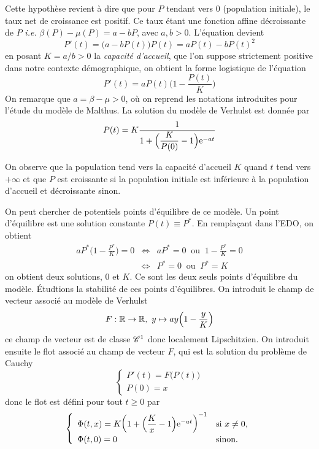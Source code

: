 Cette hypothèse revient à dire que pour $P$ tendant vers $0$ (population initiale), le taux net de croissance est positif. Ce taux étant une fonction affine décroissante de $P$ \textit{i.e.} $\beta(P)-\mu(P)=a-bP$, avec $a,b>0$. L'équation devient 
\begin{equation*}
    P'(t) = \big(a-bP(t)\big)P(t) = aP(t)-bP(t)^2
\end{equation*}
en posant $K=a/b >0$ la \textcolor{astral}{\textit{capacité d'accueil}}, que l'on suppose strictement positive dans notre contexte démographique, on obtient la forme \og logistique \fg{} de l'équation 
\begin{equation*}
    P'(t) = aP(t)\Big(1-\frac{P(t)}{K}\Big)
\end{equation*}
On remarque que $a=\beta-\mu>0$, où on reprend les notations introduites pour l'étude du modèle de Malthus. La solution du modèle de Verhulst est donnée par 
\begin{equation*}
    P(t) = K \frac{1}{1+\Big(\dfrac{K}{P(0)}-1\Big)\mathrm{e}^{-at}}
\end{equation*}

\begin{remark}
    On observe que la population tend vers la capacité d'accueil $K$ quand $t$ tend vers $+\infty$ et que $P$ est croissante si la population initiale est inférieure à la population d'accueil et décroissante sinon.
\end{remark}

On peut chercher de potentiels points d'équilibre de ce modèle. Un point d'équilibre est une solution constante $P(t) \equiv P^*$. En remplaçant dans l'EDO, on obtient
\begin{eqnarray*}
    aP^*\Big(1-\frac{P^*}{K}\Big) = 0 &\iff& aP^* = 0 \ \text{ ou } \ 1-\frac{P^*}{K} = 0 \\
    &\iff& P^* = 0 \ \text{ ou } \ P^* = K
\end{eqnarray*}
on obtient deux solutions, $0$ et $K$. Ce sont les deux seuls points d'équilibre du modèle. \'Etudtions la stabilité de ces points d'équilibres. On introduit le champ de vecteur associé au modèle de Verhulst
\begin{equation*}
    F : \mathbb{R} \rightarrow \mathbb{R}, \ y \mapsto ay\Big(1-\frac{y}{K}\Big)
\end{equation*}
ce champ de vecteur est de classe $\mathscr{C}^1$ donc localement Lipschitzien. On introduit ensuite le flot associé au champ de vecteur $F$, qui est la solution du problème de Cauchy 
\begin{equation*}
    \left\{\begin{array}{l}
        P'(t) = F\big(P(t)\big) \\
        P(0)=x
    \end{array}\right.
\end{equation*}
donc le flot est défini pour tout $t \geq 0$ par 
\begin{equation*}
    \left\{\begin{array}{ll}
        \Phi(t,x) = K \bigg(1+\Big(\dfrac{K}{x}-1\Big)\mathrm{e}^{-at}\bigg)^{-1} & \text{si } x \neq 0, \\
        \Phi(t,0) = 0 & \text{sinon.}
    \end{array}\right.
\end{equation*}


